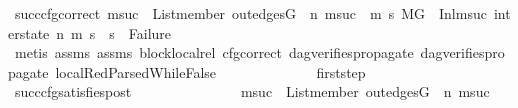 \begin{isabellebody}
\ succ{\isacharunderscore}{\kern0pt}cfg{\isacharunderscore}{\kern0pt}correct{\isacharcolon}{\kern0pt}\ {\isachardoublequoteopen}{\isacharparenleft}{\kern0pt}{\isasymforall}msuc{}{\isachardot}{\kern0pt}\ \ List{\isachardot}{\kern0pt}member\ {\isacharparenleft}{\kern0pt}out{\isacharunderscore}{\kern0pt}edges{\isacharparenleft}{\kern0pt}G{\isacharparenright}{\kern0pt}\ {\isacharbang}{\kern0pt}\ n{\isacharparenright}{\kern0pt}\ msuc{}\ {\isasymlongrightarrow}\ {\isacharparenleft}{\kern0pt}{\isasymforall}m{}\ s{}{\isachardot}{\kern0pt}\ {\isacharparenleft}{\kern0pt}{\isacharparenleft}{\kern0pt}M{\isacharcomma}{\kern0pt}{\isasymLambda}{\isacharcomma}{\kern0pt}{\isasymGamma}{\isacharcomma}{\kern0pt}{\isasymOmega}{\isacharcomma}{\kern0pt}G\ {\isasymturnstile}\ {\isacharparenleft}{\kern0pt}Inl{\isacharparenleft}{\kern0pt}msuc{}{\isacharparenright}{\kern0pt}{\isacharcomma}{\kern0pt}\ inter{\isacharunderscore}{\kern0pt}state{\isacharparenright}{\kern0pt}\ {\isacharminus}{\kern0pt}n{\isasymrightarrow}{\isacharasterisk}{\kern0pt}\ {\isacharparenleft}{\kern0pt}m{}{\isacharcomma}{\kern0pt}\ s{}{\isacharparenright}{\kern0pt}{\isacharparenright}{\kern0pt}\ {\isasymlongrightarrow}\ s{}\ {\isasymnoteq}\ Failure{\isacharparenright}{\kern0pt}{\isacharparenright}{\kern0pt}{\isacharparenright}{\kern0pt}{\isachardoublequoteclose}\isanewline
\ \ \ \ \ \ \ \ \ \ \ \ \ \ \isamarkupfalse%
\ {\isacharparenleft}{\kern0pt}metis\ assms{\isacharparenleft}{\kern0pt}{}{\isacharparenright}{\kern0pt}\ assms{\isacharparenleft}{\kern0pt}{}{\isacharparenright}{\kern0pt}\ block{\isacharunderscore}{\kern0pt}local{\isacharunderscore}{\kern0pt}rel\ cfg{\isacharunderscore}{\kern0pt}correct\ dag{\isacharunderscore}{\kern0pt}verifies{\isacharunderscore}{\kern0pt}propagate\ dag{\isacharunderscore}{\kern0pt}verifies{\isacharunderscore}{\kern0pt}propagate{\isacharunderscore}{\kern0pt}{}\ local{\isachardot}{\kern0pt}RedParsedWhileFalse{\isacharparenleft}{\kern0pt}{}{\isacharparenright}{\kern0pt}{\isacharparenright}{\kern0pt}\isanewline
\isanewline
\ \ \ \ \ \ \ \ \ \ \ \ \isamarkupfalse%
\ first{\isacharunderscore}{\kern0pt}step\isanewline
\ \ \ \ \ \ \ \ \ \ \ \ \isamarkupfalse%
\ succ{\isacharunderscore}{\kern0pt}cfg{\isacharunderscore}{\kern0pt}satisfies{\isacharunderscore}{\kern0pt}post{\isacharcolon}{\kern0pt}\ \isanewline
\ \ \ \ \ \ \ \ \ \ \ \ \ \ {\isachardoublequoteopen}{\isacharparenleft}{\kern0pt}{\isasymforall}msuc{}{\isachardot}{\kern0pt}\ \ List{\isachardot}{\kern0pt}member\ {\isacharparenleft}{\kern0pt}out{\isacharunderscore}{\kern0pt}edges{\isacharparenleft}{\kern0pt}G{\isacharparenright}{\kern0pt}\ {\isacharbang}{\kern0pt}\ n{\isacharparenright}{\kern0pt}\ msuc{}\ {\isasymlongrightarrow}\ \isanewline

\end{isabellebody}
